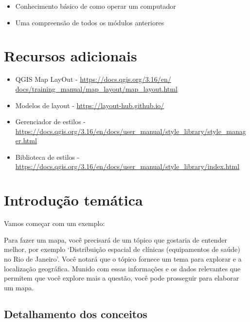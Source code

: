\documentclass[
]{book}
\providecommand{\tightlist}{%
  \setlength{\itemsep}{0pt}\setlength{\parskip}{0pt}}
\begin{document}
\begin{itemize}
\tightlist
\item
  Conhecimento básico de como operar um computador
\item
  Uma compreensão de todos os módulos anteriores
\end{itemize}

\hypertarget{recursos-adicionais-5}{%
\section{Recursos adicionais}\label{recursos-adicionais-5}}

\begin{itemize}
\tightlist
\item
  QGIS Map LayOut - \href{https://docs.qgis.org/3.16/en/docs/training_manual/map_layout/map_layout.html}{https://docs.qgis.org/3.16/en/ docs/training\_manual/map\_layout/map\_layout.html}
\item
  Modelos de layout - \url{https://layout-hub.github.io/}
\item
  Gerenciador de estilos - \url{https://docs.qgis.org/3.16/en/docs/user_manual/style_library/style_manager.html}
\item
  Biblioteca de estilos - \url{https://docs.qgis.org/3.16/en/docs/user_manual/style_library/index.html}
\end{itemize}

\hypertarget{introduuxe7uxe3o-temuxe1tica-5}{%
\section{Introdução temática}\label{introduuxe7uxe3o-temuxe1tica-5}}

Vamos começar com um exemplo:

Para fazer um mapa, você precisará de um tópico que gostaria de entender melhor, por exemplo `Distribuição espacial de clínicas (equipamentos de saúde) no Rio de Janeiro'. Você notará que o tópico fornece um tema para explorar e a localização geográfica. Munido com essas informações e os dados relevantes que permitem que você explore mais a questão, você pode prosseguir para elaborar um mapa.

\hypertarget{detalhamento-dos-conceitos-2}{%
\subsection{Detalhamento dos conceitos}\label{detalhamento-dos-conceitos-2}}
\end{document}
